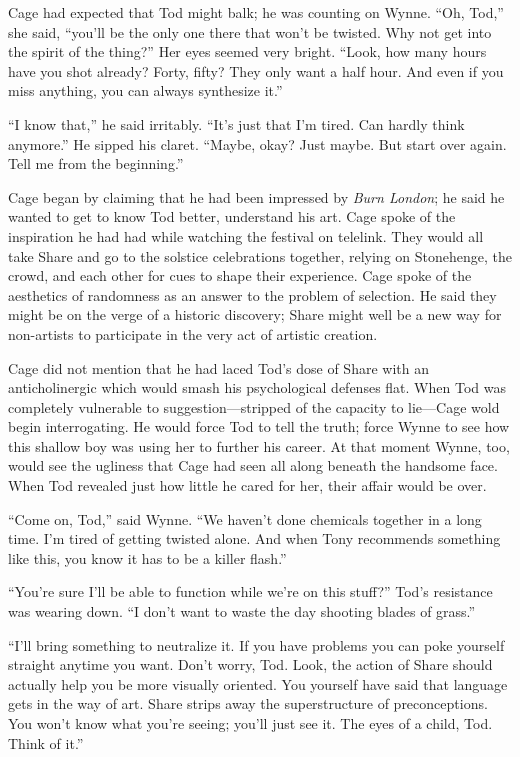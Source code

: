 Cage had expected that Tod might balk; he was counting on Wynne. ``Oh, Tod,'' she said, ``you'll be the only one there that won't be twisted. Why not get into the spirit of the thing?'' Her eyes seemed very bright. ``Look, how many hours have you shot already? Forty, fifty? They only want a half hour. And even if you miss anything, you can always synthesize it.''

``I know that,'' he said irritably. ``It's just that I'm tired. Can hardly think anymore.'' He sipped his claret. ``Maybe, okay? Just maybe. But start over again. Tell me from the beginning.''

Cage began by claiming that he had been impressed by \textit{Burn London}; he said he wanted to get to know Tod better, understand his art. Cage spoke of the inspiration he had had while watching the festival on telelink. They would all take Share and go to the solstice celebrations together, relying on Stonehenge, the crowd, and each other for cues to shape their experience. Cage spoke of the aesthetics of randomness as an answer to the problem of selection. He said they might be on the verge of a historic discovery; Share might well be a new way for non-artists to participate in the very act of artistic creation.

Cage did not mention that he had laced Tod's dose of Share with an anticholinergic which would smash his psychological defenses flat. When Tod was completely vulnerable to suggestion---stripped of the capacity to lie---Cage wold begin interrogating. He would force Tod to tell the truth; force Wynne to see how this shallow boy was using her to further his career. At that moment Wynne, too, would see the ugliness that Cage had seen all along beneath the handsome face. When Tod revealed just how little he cared for her, their affair would be over.

``Come on, Tod,'' said Wynne. ``We haven't done chemicals together in a long time. I'm tired of getting twisted alone. And when Tony recommends something like this, you know it has to be a killer flash.''

``You're sure I'll be able to function while we're on this stuff?'' Tod's resistance was wearing down. ``I don't want to waste the day shooting blades of grass.''

``I'll bring something to neutralize it. If you have problems you can poke yourself straight anytime you want. Don't worry, Tod. Look, the action of Share should actually help you be more visually oriented. You yourself have said that language gets in the way of art. Share strips away the superstructure of preconceptions. You won't know what you're seeing; you'll just see it. The eyes of a child, Tod. Think of it.''

